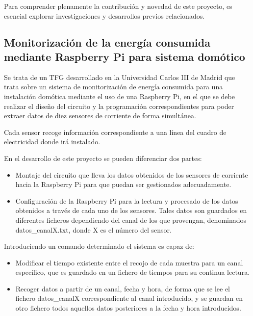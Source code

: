 
Para comprender plenamente la contribución y novedad de este proyecto, es esencial explorar investigaciones y desarrollos previos relacionados.

\subsection{Monitorización de la energía consumida mediante Raspberry Pi para sistema domótico}\label{Proy1}

Se trata de un TFG desarrollado en la Universidad Carlos III de Madrid que trata sobre un sistema de monitorización de energía consumida para una instalación domótica mediante el uso de una Raspberry Pi, en el que se debe realizar el diseño del circuito y la programación correspondientes para poder extraer datos de diez sensores de corriente de forma simultánea.

Cada sensor recoge información correspondiente a una línea del cuadro de electricidad donde irá instalado.

En el desarrollo de este proyecto se pueden diferenciar dos partes:

\begin{itemize}
\item Montaje del circuito que lleva los datos obtenidos de los sensores de corriente hacia la Raspberry Pi para que puedan ser gestionados adecuadamente.

\item Configuración de la Raspberry Pi para la lectura y procesado de los datos obtenidos a través de cada uno de los sensores. Tales datos son guardados en diferentes ficheros dependiendo del canal de los que provengan, denominados datos\_canalX.txt, donde X es el número del sensor.
\end{itemize}

Introduciendo un comando determinado el sistema es capaz de:

\begin{itemize}
	\item Modificar el tiempo existente entre el recojo de cada muestra para un canal específico, que es guardado en un fichero de tiempos para su continua lectura.
	\item Recoger datos a partir de un canal, fecha y hora, de forma que se lee el fichero datos\_canalX correspondiente al canal introducido, y se guardan en otro fichero todos aquellos datos posteriores a la fecha y hora introducidos.
\end{itemize}

